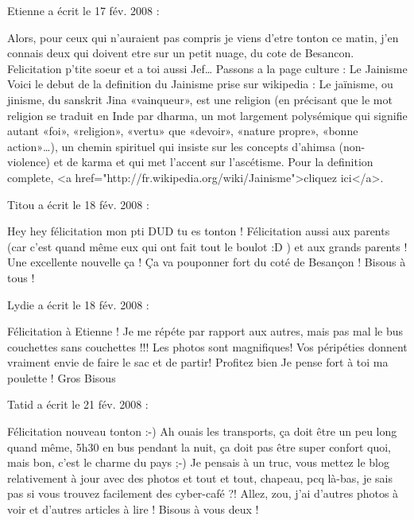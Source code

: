 \medskip
Etienne a écrit le 17 fév. 2008 :
\begin{displayquote}
Alors, pour ceux qui n'auraient pas compris je viens d'etre tonton ce matin, j'en connais deux qui doivent etre sur un petit nuage, du cote de Besancon. Felicitation p'tite soeur et a toi aussi Jef\dots
Passons a la page culture : Le Jainisme
Voici le debut de la definition du Jainisme prise sur wikipedia : Le jaïnisme, ou jinisme, du sanskrit Jina «vainqueur», est une religion (en précisant que le mot religion se traduit en Inde par dharma, un mot largement polysémique qui signifie autant «foi», «religion», «vertu» que «devoir», «nature propre», «bonne action»\dots), un chemin spirituel qui insiste sur les concepts d'ahimsa (non-violence) et de karma et qui met l'accent sur l'ascétisme.
Pour la definition complete, <a href="http://fr.wikipedia.org/wiki/Jainisme">cliquez ici</a>.
\end{displayquote}

\medskip
Titou a écrit le 18 fév. 2008 :
\begin{displayquote}
Hey hey félicitation mon pti DUD tu es tonton ! Félicitation aussi aux parents (car c'est quand même eux qui ont fait tout le boulot :D )  et aux grands parents ! Une excellente nouvelle ça ! Ça va pouponner fort du coté de Besançon ! Bisous à tous !
\end{displayquote}

\medskip
Lydie a écrit le 18 fév. 2008 :
\begin{displayquote}
Félicitation à Etienne !
Je me répéte par rapport aux autres, mais pas mal le bus couchettes sans couchettes !!!
Les photos sont magnifiques! Vos péripéties donnent vraiment envie de faire le sac et de partir!
Profitez bien
Je pense fort à toi ma poulette !
Gros Bisous
\end{displayquote}

\medskip
Tatid a écrit le 21 fév. 2008 :
\begin{displayquote}
Félicitation nouveau tonton :-)
Ah ouais les transports, ça doit être un peu long quand même, 5h30 en bus pendant la nuit, ça doit pas être super confort quoi, mais bon, c'est le charme du pays ;-)
Je pensais à un truc, vous mettez le blog relativement à jour avec des photos et tout et tout, chapeau, pcq là-bas, je sais pas si vous trouvez facilement des cyber-café ?!
Allez, zou, j'ai d'autres photos à voir et d'autres articles à lire !
Bisous à vous deux !
\end{displayquote}

\vfill
